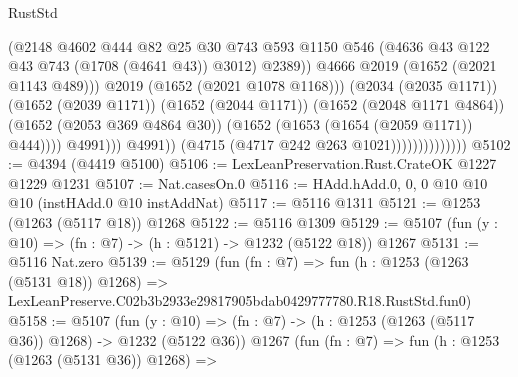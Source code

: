 \begin{lexlean}{RustStd}
\begin{coremodule}
                                                (@2148
                                                  @4602
                                                  @444
                                                  @82
                                                  @25
                                                  @30
                                                  @743
                                                  @593
                                                  @1150
                                                  @546
                                                  (@4636
                                                    @43
                                                    @122
                                                    @43
                                                    @743
                                                    (@1708 (@4641 @43))
                                                    @3012)
                                                  @2389))
                                              @4666
                                              @2019
                                              (@1652 (@2021 @1143 @489)))
                                            @2019
                                            (@1652 (@2021 @1078 @1168)))
                                          (@2034 (@2035 @1171))
                                          (@1652 (@2039 @1171))
                                          (@1652 (@2044 @1171))
                                          (@1652 (@2048 @1171 @4864))
                                          (@1652 (@2053 @369 @4864 @30))
                                          (@1652 (@1653 (@1654 (@2059 @1171)) @444))))
                                      @4991)))
                                @4991))
                            (@4715 (@4717 @242 @263 @1021))))))))))))))
@5102 := @4394 (@4419 @5100)
@5106 := LexLeanPreservation.Rust.CrateOK @1227 @1229 @1231
@5107 := Nat.casesOn.{0}
@5116 := HAdd.hAdd.{0, 0, 0} @10 @10 @10 (instHAdd.{0} @10 instAddNat)
@5117 := @5116 @1311
@5121 := @1253 (@1263 (@5117 @18)) @1268
@5122 := @5116 @1309
@5129 := @5107 (fun (y : @10) => (fn : @7) -> (h : @5121) -> @1232 (@5122 @18)) @1267
@5131 := @5116 Nat.zero
@5139 := @5129
    (fun (fn : @7) =>
    fun (h : @1253 (@1263 (@5131 @18)) @1268) =>
    LexLeanPreserve.C02b3b2933e29817905bdab0429777780.R18.RustStd.fun0)
@5158 := @5107
    (fun (y : @10) => (fn : @7) -> (h : @1253 (@1263 (@5117 @36)) @1268) -> @1232 (@5122 @36))
    @1267
    (fun (fn : @7) =>
    fun (h : @1253 (@1263 (@5131 @36)) @1268) =>

\end{coremodule}
\end{lexlean}
